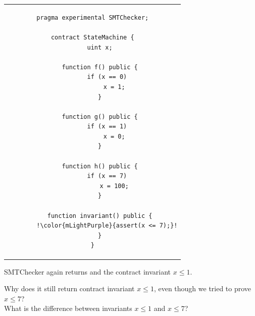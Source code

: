 \documentclass[aspectratio=169,10pt]{beamer}
\begin{document}
\begin{frame}[fragile]
\begin{center}
\begin{tabular}{c}
\begin{lstlisting}[basicstyle=\tiny,escapechar=!]
pragma experimental SMTChecker;

contract StateMachine {
    uint x;

    function f() public {
        if (x == 0)
            x = 1;
    }

    function g() public {
        if (x == 1)
            x = 0;
    }

    function h() public {
        if (x == 7)
            x = 100;
    }

    function invariant() public {
        !\color{mLightPurple}{assert(x <= 7);}!
    }
}
\end{lstlisting}
\end{tabular}
\end{center}
SMTChecker again returns {\color{mLightPurple}{safe}} and the contract invariant $x \le 1$.
\end{frame}

\begin{frame}
Why does it still return contract invariant $x \le 1$, even though we tried to prove $x \le 7$?\\
What is the difference between invariants $x \le 1$ and $x \le 7$?
\end{frame}
\end{document}
